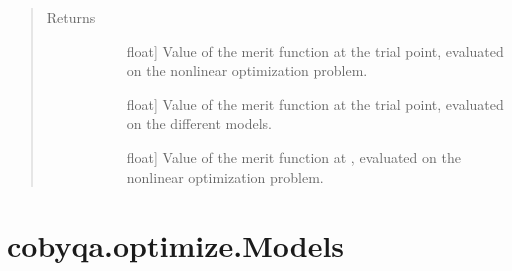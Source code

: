 \documentclass[letterpaper,10pt,english]{sphinxmanual}
\begin{document}
\begin{fulllineitems}
\begin{fulllineitems}
\begin{quote}
\begin{description}
\begin{description}
\end{description}

\item[{Returns}] \leavevmode\begin{description}
\item[{}] \leavevmode{[}float{]}
\sphinxAtStartPar
Value of the merit function at the trial point, evaluated on the
nonlinear optimization problem.

\item[{}] \leavevmode{[}float{]}
\sphinxAtStartPar
Value of the merit function at the trial point, evaluated on the
different models.

\item[{}] \leavevmode{[}float{]}
\sphinxAtStartPar
Value of the merit function at , evaluated on the nonlinear
optimization problem.

\end{description}

\end{description}\end{quote}

\end{fulllineitems}


\end{fulllineitems}



\section{cobyqa.optimize.Models}
\label{\detokenize{refs/generated/cobyqa.optimize.Models:cobyqa-optimize-models}}\label{\detokenize{refs/generated/cobyqa.optimize.Models::doc}}
\end{document}
